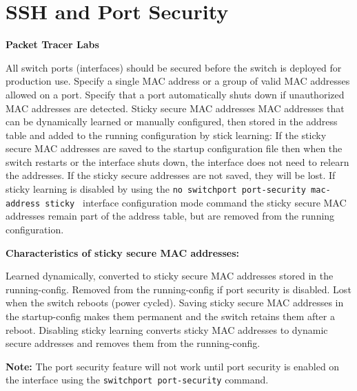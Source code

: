 \documentclass[../EngineeringJournal_CDavis.tex]{subfiles}
\begin{document}

\chapter*{SSH and Port \linebreak[1] Security \hspace*{\fill}{2020}}
\noindent\textbf{{Packet Tracer Labs} }                             



\hspace{0.2cm}
\begin{tcolorbox}[width=6.3in]
\scriptsize 
\begin{outline}
  \1 All switch ports (interfaces) should be secured before the switch is deployed for production use.
      \2 Specify a single MAC address or a group of valid MAC addresses allowed on a port.
      \2 Specify that a port automatically shuts down if unauthorized MAC addresses are detected.
  \1 Sticky secure MAC addresses
      \2 MAC addresses that can be dynamically learned or manually configured, then 
      \2 stored in the address table and added to the running configuration by stick learning:
  \1 If the sticky secure MAC addresses are saved to the startup configuration file
      \2 then when the switch restarts or the interface shuts down, the interface does not need to relearn the addresses. 
      \2 If the sticky secure addresses are not saved, they will be lost.
  \1 If sticky learning is disabled by using the 
  {\verb$no switchport port-security mac-address sticky $}
  interface configuration mode command
      \2the sticky secure MAC addresses remain part of the address table, but are removed from the running configuration.
\end{outline}
  {\bf{Characteristics of sticky secure MAC addresses:}}
\begin{outline}
  \1 Learned dynamically, converted to sticky secure MAC addresses stored in the running-config.
  \1 Removed from the running-config if port security is disabled.
  \1 Lost when the switch reboots (power cycled).
  \1 Saving sticky secure MAC addresses in the startup-config makes them permanent and the switch retains them after a reboot.
  \1 Disabling sticky learning converts sticky MAC addresses to dynamic secure addresses and removes them from the running-config.
\end{outline}
\normalsize  
{\bf{Note:}} The port security feature will not work until port security is
enabled on the interface using the {\scriptsize{\verb$switchport port-security$}\normalsize}  command.
\end{tcolorbox}
\hspace{0.2cm}
\end{document}
